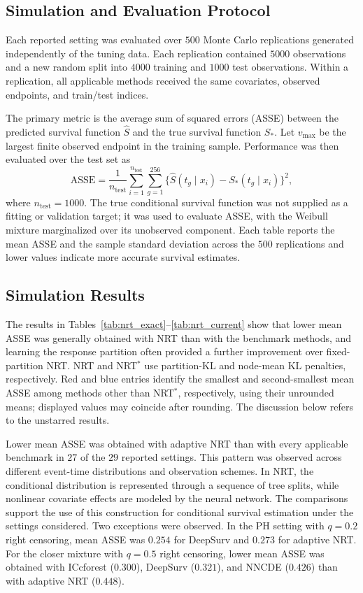 \documentclass[11pt]{article}
\numberwithin{equation}{section}
\begin{document}
\subsection{Simulation and Evaluation Protocol}
\label{subsec:simulation-evaluation}
Each reported setting was evaluated over $500$ Monte Carlo replications generated independently of the tuning data. Each replication contained $5000$ observations and a new random split into $4000$ training and $1000$ test observations. Within a replication, all applicable methods received the same covariates, observed endpoints, and train/test indices.

The primary metric is the average sum of squared errors (ASSE) between the predicted survival function $\hat S$ and the true survival function $S_*$. Let $v_{\max}$ be the largest finite observed endpoint in the training sample. Performance was then evaluated over the test set as
\begin{equation}
  \mathrm{ASSE}
  =
  \frac{1}{n_{\mathrm{test}}}
  \sum_{i=1}^{n_{\mathrm{test}}}
  \sum_{g=1}^{256}
  \{\hat S(t_g\mid x_i)-S_*(t_g\mid x_i)\}^2,
  \label{eq:asse}
\end{equation}
where $n_{\mathrm{test}}=1000$. The true conditional survival function was not supplied as a fitting or validation target; it was used to evaluate ASSE, with the Weibull mixture marginalized over its unobserved component. Each table reports the mean ASSE and the sample standard deviation across the $500$ replications and lower values indicate more accurate survival estimates. 

\subsection{Simulation Results}
The results in Tables~\ref{tab:nrt_exact}--\ref{tab:nrt_current} show that lower mean ASSE was generally obtained with NRT than with the benchmark methods, and learning the response partition often provided a further improvement over fixed-partition NRT. NRT and NRT$^{*}$ use partition-KL and node-mean KL penalties, respectively. Red and blue entries identify the smallest and second-smallest mean ASSE among methods other than NRT$^{*}$, respectively, using their unrounded means; displayed values may coincide after rounding. The discussion below refers to the unstarred results.

Lower mean ASSE was obtained with adaptive NRT than with every applicable benchmark in $27$ of the $29$ reported settings. This pattern was observed across different event-time distributions and observation schemes. In NRT, the conditional distribution is represented through a sequence of tree splits, while nonlinear covariate effects are modeled by the neural network. The comparisons support the use of this construction for conditional survival estimation under the settings considered. Two exceptions were observed. In the PH setting with $q=0.2$ right censoring, mean ASSE was $0.254$ for DeepSurv and $0.273$ for adaptive NRT. For the closer mixture with $q=0.5$ right censoring, lower mean ASSE was obtained with ICcforest ($0.300$), DeepSurv ($0.321$), and NNCDE ($0.426$) than with adaptive NRT ($0.448$).
\end{document}
